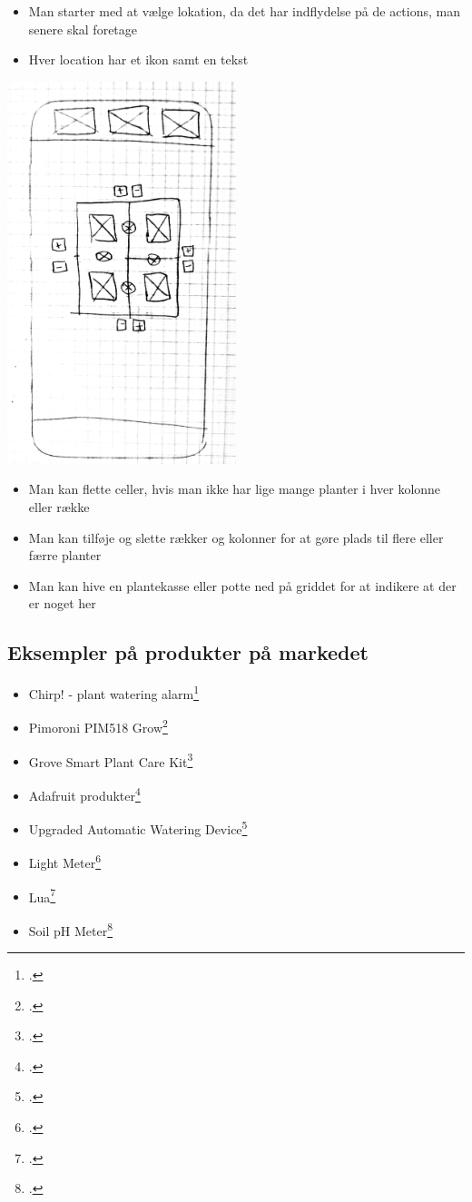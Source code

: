 \begin{itemize}
    \item Man starter med at vælge lokation, da det har indflydelse på de actions, man senere skal foretage
    \item Hver location har et ikon samt en tekst
\end{itemize}

\includegraphics[width=0.5\textwidth]{img/s1-8.jpg}\\

\begin{itemize}
    \item Man kan flette celler, hvis man ikke har lige mange planter i hver kolonne eller række
    \item Man kan tilføje og slette rækker og kolonner for at gøre plads til flere eller færre planter
    \item Man kan hive en plantekasse eller potte ned på griddet for at indikere at der er noget her
\end{itemize}

\subsection{Eksempler på produkter på markedet}
\label{products-on-market}

\begin{itemize}
    \item Chirp! - plant watering alarm\footcite{chirp}
    \item Pimoroni PIM518 Grow\footcite{sparkfun}
    \item Grove Smart Plant Care Kit\footcite{seeedstudio}
    \item Adafruit produkter\footcite{adafruit}
    \item Upgraded Automatic Watering Device\footcite{banggood}
    \item Light Meter\footcite{hackster}
    \item Lua\footcite{lua}
    \item Soil pH Meter\footcite{amazon}
\end{itemize}

